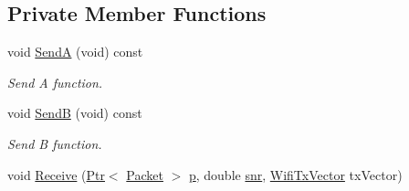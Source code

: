 \subsection*{Private Member Functions}
\begin{DoxyCompactItemize}
\item 
void \hyperlink{classCollisionExperiment_a608297494bb102c21fab0dadc395d386}{SendA} (void) const 
\begin{DoxyCompactList}\small\item\em Send A function. \end{DoxyCompactList}\item 
void \hyperlink{classCollisionExperiment_a4213d45a78cf765e777fbf61f301371f}{SendB} (void) const 
\begin{DoxyCompactList}\small\item\em Send B function. \end{DoxyCompactList}\item 
void \hyperlink{classCollisionExperiment_a2fa3254a3aec9a767974ee12c19ae6e6}{Receive} (\hyperlink{classns3_1_1Ptr}{Ptr}$<$ \hyperlink{classns3_1_1Packet}{Packet} $>$ \hyperlink{lte__link__budget__x2__handover__measures_8m_ac9de518908a968428863f829398a4e62}{p}, double \hyperlink{lte__pathloss_8m_ae6e82a215dff6b79fb6e9952a1b78453}{snr}, \hyperlink{classns3_1_1WifiTxVector}{Wifi\+Tx\+Vector} tx\+Vector)
\end{DoxyCompactItemize}
